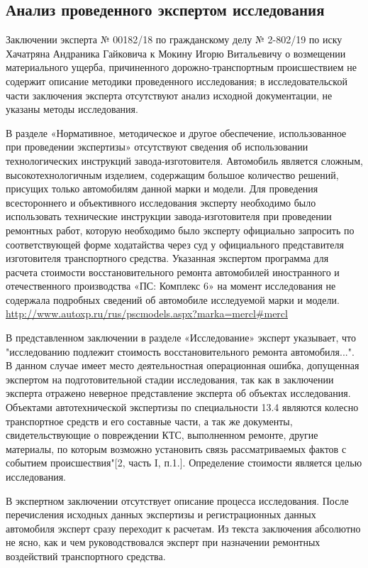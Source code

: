 \subsection{ Анализ проведенного экспертом исследования}

Заключении эксперта  № 00182/18 по гражданскому делу № 2-802/19 по иску Хачатряна Андраника Гайковича к Мокину Игорю Витальевичу о возмещении материального ущерба, причиненного дорожно-транспортным происшествием не  содержит описание методики проведенного исследования; в исследовательской части заключения эксперта отсутствуют анализ исходной документации, не указаны методы исследования.


В разделе «Нормативное, методическое и другое обеспечение, использованное при проведении экспертизы»   отсутствуют сведения об использовании технологических инструкций завода-изготовителя. Автомобиль  является сложным, высокотехнологичным изделием, содержащим большое количество решений, присущих только автомобилям данной марки и модели.  Для проведения всестороннего и объективного исследования эксперту  необходимо было использовать технические инструкции завода-изготовителя при проведении ремонтных работ, которую необходимо было эксперту официально запросить по соответствующей форме ходатайства через суд у официального представителя изготовителя транспортного средства. Указанная экспертом программа для расчета стоимости восстановительного ремонта автомобилей иностранного и отечественного производства «ПС: Комплекс 6» на момент исследования не содержала подробных сведений об автомобиле исследуемой марки и модели. \url{http://www.autoxp.ru/rus/pscmodels.aspx?marka=mercl#mercl}



В представленном заключении в разделе «Исследование» эксперт указывает, что "исследованию подлежит стоимость восстановительного ремонта автомобиля...".  В данном случае имеет место деятельностная операционная ошибка, допущенная экспертом на подготовительной стадии исследования, так как в заключении эксперта отражено неверное представление эксперта об объектах исследования. Объектами автотехнической экспертизы по специальности 13.4 являются колесно транспортное средств и его  составные части, а так же документы, свидетельствующие о повреждении КТС, выполненном ремонте, другие материалы, по которым возможно установить связь рассматриваемых фактов с событием происшествия"[2, часть I, п.1.]. Определение стоимости является целью исследования.



В экспертном заключении  отсутствует описание процесса  исследования.  После перечисления исходных данных экспертизы и  регистрационных данных автомобиля эксперт сразу переходит к расчетам. Из текста заключения абсолютно не ясно, как и чем руководствовался эксперт при назначении   ремонтных воздействий транспортного средства.\\


